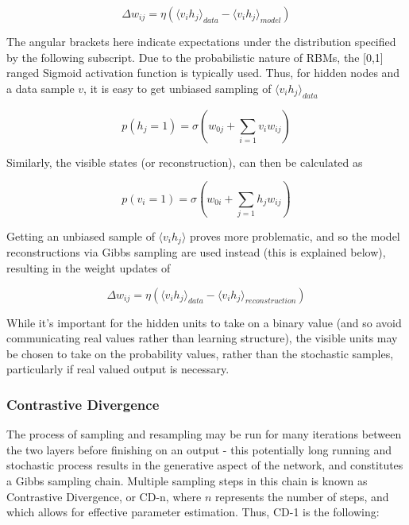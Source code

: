 \documentclass[a4paper,11pt,oneside]{article}
\theoremstyle{plain}
\theoremstyle{definition}
\begin{document}
\begin{equation}
\Delta w_{ij} = \eta (\langle v_ih_j\rangle_{data} - \langle v_ih_j\rangle_{model})
\end{equation}

The angular brackets here indicate expectations under the distribution specified by the following subscript. Due to the probabilistic nature of RBMs, the [0,1] ranged Sigmoid activation function is typically used. Thus, for hidden nodes and a data sample $v$, it is easy to get unbiased sampling of $\langle v_ih_j \rangle_{data}$

\begin{equation}
p(h_j=1) = \sigma(w_{0j} +  \sum_{i=1}v_iw_{ij})
\end{equation}

Similarly, the visible states (or reconstruction), can then be calculated as 

\begin{equation}
p(v_i=1) = \sigma(w_{0i} + \sum_{j=1}h_jw_{ij})
\end{equation}


Getting an unbiased sample of $\langle v_i h_j \rangle$ proves more problematic, and so the model reconstructions via Gibbs sampling are used instead (this is explained below), resulting in the weight updates of

\begin{equation}
\Delta w_{ij} = \eta (\langle v_ih_j\rangle_{data} - \langle v_ih_j\rangle_{reconstruction})
\end{equation}

While it's important for the hidden units to take on a binary value (and so avoid communicating real values rather than learning structure), the visible units may be chosen to take on the probability values, rather than the stochastic samples, particularly if real valued output is necessary. 

\subsubsection{Contrastive Divergence}\label{imp_CD}

The process of sampling and resampling may be run for many iterations between the two layers before finishing on an output - this potentially long running and stochastic process results in the generative aspect of the network, and constitutes a Gibbs sampling chain. Multiple sampling steps in this chain is known as Contrastive Divergence, or CD-n, where $n$ represents the number of steps, and which allows for effective parameter estimation. Thus, CD-1 is the following:\newline
\end{document}
